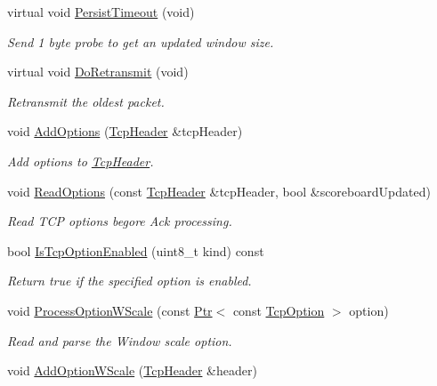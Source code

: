 \begin{DoxyCompactItemize}
virtual void \hyperlink{classns3_1_1TcpSocketBase_a80fe451da81e0059154321eee693de31}{Persist\+Timeout} (void)
\begin{DoxyCompactList}\small\item\em Send 1 byte probe to get an updated window size. \end{DoxyCompactList}\item 
virtual void \hyperlink{classns3_1_1TcpSocketBase_a13b6b897811a48523988f8af6e9130d3}{Do\+Retransmit} (void)
\begin{DoxyCompactList}\small\item\em Retransmit the oldest packet. \end{DoxyCompactList}\item 
void \hyperlink{classns3_1_1TcpSocketBase_a55087ef950f5c2f4a7cdb8c825666955}{Add\+Options} (\hyperlink{classns3_1_1TcpHeader}{Tcp\+Header} \&tcp\+Header)
\begin{DoxyCompactList}\small\item\em Add options to \hyperlink{classns3_1_1TcpHeader}{Tcp\+Header}. \end{DoxyCompactList}\item 
void \hyperlink{classns3_1_1TcpSocketBase_a5fc67b6d49bb81a520c67cd6018954bb}{Read\+Options} (const \hyperlink{classns3_1_1TcpHeader}{Tcp\+Header} \&tcp\+Header, bool \&scoreboard\+Updated)
\begin{DoxyCompactList}\small\item\em Read T\+CP options begore Ack processing. \end{DoxyCompactList}\item 
bool \hyperlink{classns3_1_1TcpSocketBase_afb18d462bc2f1c1fe7f47d9e909b007a}{Is\+Tcp\+Option\+Enabled} (uint8\+\_\+t kind) const 
\begin{DoxyCompactList}\small\item\em Return true if the specified option is enabled. \end{DoxyCompactList}\item 
void \hyperlink{classns3_1_1TcpSocketBase_a4674edd220672235e629cb3e3b2a673f}{Process\+Option\+W\+Scale} (const \hyperlink{classns3_1_1Ptr}{Ptr}$<$ const \hyperlink{classns3_1_1TcpOption}{Tcp\+Option} $>$ option)
\begin{DoxyCompactList}\small\item\em Read and parse the Window scale option. \end{DoxyCompactList}\item 
void \hyperlink{classns3_1_1TcpSocketBase_aa749dc3f6287c79a2ad39cb306220663}{Add\+Option\+W\+Scale} (\hyperlink{classns3_1_1TcpHeader}{Tcp\+Header} \&header)

\end{DoxyCompactItemize}
